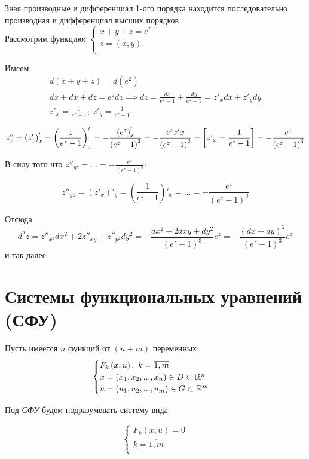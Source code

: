 \documentclass[../../main.tex]{subfiles}
\begin{document}
\begin{exmp}
Зная производные и дифференциал 1-ого порядка находится последовательно
производная и дифференциал высших порядков. \\
Рассмотрим функцию:
$\begin{cases}
    x + y + z = e^z \\
    z = \left(x, y\right). \\
\end{cases}$

Имеем:
\[
\begin{array}{l}
d\left(x + y + z\right) = d(e^2) \\
dx + dx + dz = e^zdz \implies dz = \frac{dx}{e^z - 1}
+ \frac{dy}{e^z - 1} = z'_xdx + z'_ydy \\
z'_x = \frac{1}{e^z - 1};\ z'_y = \frac{1}{e^z - 1}
\end{array}
\]

\[z''_x = \left(z'_x\right)'_x = \left(\frac{1}{e^z - 1}\right)'_x
= -\frac{\left(e^z\right)'_x}{\left(e^z - 1\right)^2} =
- \frac{e^zz'x}{\left(e^z - 1\right)^2} = \left[z`_x
= \frac{1}{e^z - 1} \right] =
- \frac{e^z}{\left(e^z - 1\right)^3}\]

В силу того что $\displaystyle z''_{yz} = ... = - 
\frac{e^z}{\left(e^z - 1\right)^3}$:

\[z''_{yz} = \left(z'_x\right)'_y = \left(\frac{1}{e^z - 1} \right)'_x = ... =
- \frac{e^z}{\left(e^z - 1\right)^3}\]

Отсюда
\[d^2z = z''_{x^2}dx^2 + 2z''_{xy} + z''_{y^2}dy^2 =
-\frac{dx^2 + 2dxy + dy^2}{\left(e^z - 1\right)^3} e^z = 
-\frac{\left(dx + dy\right)^2}{\left(e^z - 1\right)^3} e^z\]
и так далее.
\end{exmp}

\section{Системы функциональных уравнений (СФУ)}
Пусть имеется $n$ функций от $\left(n + m\right)$ переменных:
\[\begin{cases}
    F_k\left(x, u \right),\ k = \overline{1, m} \\
    x = \left(x_1, x_2, ..., x_n\right) \in D \subset \mathbb{R}^n \\
    u = \left(u_1, u_2, ..., u_m\right) \in G \subset \mathbb{R}^m
\end{cases}
\]

Под \emph{СФУ} будем подразумевать систему вида

\begin{equation}
    \label{lec_9.num_7}
    \begin{cases} 
        F_k\left(x, u\right) = 0 \\ 
        k = \overline{1, m} \\
    \end{cases}    
\end{equation}
\end{document}

